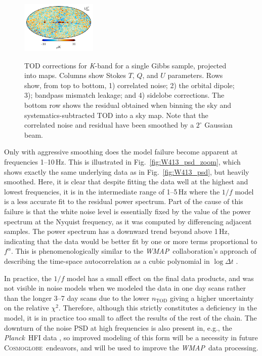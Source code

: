 \documentclass[twocolumn]{../../common/aa}
\def\WMAP{\emph{WMAP}}
\def\Planck{\emph{Planck}}
\newcommand{\cosmoglobe}{\textsc{Cosmoglobe}}
\newcommand{\K}[0]{\textit K}
\begin{document}
\begin{figure}[t]
	\includegraphics[width=0.32\textwidth]{figures/K_res_U.pdf}\\
	\caption{TOD corrections for \K-band for a single Gibbs sample, projected into maps. Columns show Stokes $T$, $Q$, and $U$ parameters. Rows show, from top to bottom, 1) correlated noise; 2) the orbital dipole; 3); bandpass mismatch leakage; and 4) sidelobe corrections. The bottom row shows the residual obtained when binning the sky and systematics-subtracted TOD into a sky map. Note that the correlated noise and residual have been smoothed by a $2^\circ$ Gaussian beam.}
	\label{fig:tod_corrections}
\end{figure}

Only with aggressive smoothing does the model failure become apparent
at frequencies 1--10\,Hz. This is illustrated in
Fig.~\ref{fig:W413_psd_zoom}, which shows exactly the same underlying
data as in Fig.~\ref{fig:W413_psd}, but heavily smoothed. Here, it is
clear that despite fitting the data well at the highest and lowest
frequencies, it is in the intermediate range of 1--5\,Hz where the
$1/f$ model is a less accurate fit to the residual power
spectrum. Part of the cause of this failure is that the white noise
level is essentially fixed by the value of the power spectrum at the
Nyquist frequency, as it was computed by differencing adjacent
samples. The power spectrum has a downward trend beyond above 1\,Hz,
indicating that the data would be better fit by one or more terms
proportional to $f^\alpha$. This is phenomenologically similar to the
\WMAP\ collaboration's approach of describing the time-space
autocorrelation as a cubic polynomial in $\log\Delta t$
\citep{jarosik2007}.

In practice, the $1/f$ model has a small effect on the final data products, and
was not visible in noise models when we modeled the data in one day scans
rather than the longer 3--7 day scans due to the lower $n_\mathrm{TOD}$ giving
a higher uncertainty on the relative $\chi^2$.  Therefore, although this
strictly constitutes a deficiency in the model, it is in practice too small to
affect the results of the rest of the chain. The downturn of the noise PSD at
high frequencies is also present in, e.g., the \Planck\ HFI data
\citep[Fig.~1]{planck2014-a10}, so improved modeling of this form will be a
necessity in future \cosmoglobe\ endeavors, and will be used to improve the
\WMAP\ data processing.
\end{document}
